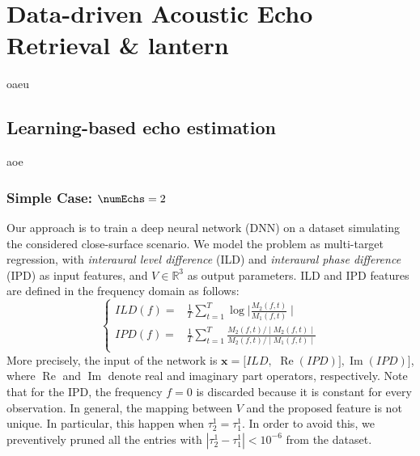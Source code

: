 \chapter{Data-driven Acoustic Echo Retrieval & lantern}\label{chap:lantern}


oaeu

\section{Learning-based echo estimation}

aoe

\subsection{Simple Case: $\numEchs = 2$}

Our approach is to train a deep neural network (DNN) on a dataset simulating the considered close-surface scenario.
We model the problem as multi-target regression, with \textit{interaural level difference} (ILD)
and \textit{interaural phase difference} (IPD) as input features, and $V \in \mathbb{R}^3$ as output parameters.
ILD and IPD features are defined in the frequency domain as follows:
\begin{equation}
\label{eq:mirage:features}
\begin{cases}
ILD(f)  =& \tfrac{1}{T} \sum_{t=1}^T \log{\mid \frac{M_2(f,t)}{M_1(f,t)} \mid } \\
IPD(f)  =& \tfrac{1}{T} \sum_{t=1}^T \frac{M_2(f,t)/ \mid M_2(f,t) \mid }{M_2(f,t) / \mid M_1(f,t)  \mid}\\
\end{cases}
\end{equation}
More precisely, the input of the network is
$\mathbf{x} = [ILD,$ $\operatorname{Re}(IPD)], \operatorname{Im}(IPD)]$, where $\operatorname{Re}$
and $\operatorname{Im}$ denote real and imaginary part operators, respectively.
Note that for the IPD, the frequency $f=0$ is discarded because it is constant for every observation.
In general, the mapping between $V$ and the proposed feature is not unique.
In particular, this happen when $\tau_2^1 = \tau_1^1$.
In order to avoid this, we preventively pruned all the entries
with $| \tau_2^1 - \tau_1^1 | < 10^{-6}$ from the dataset.

